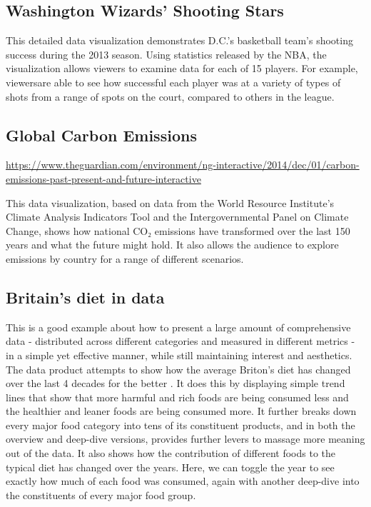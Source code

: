 \documentclass[]{book}
\theoremstyle{definition}
\theoremstyle{definition}
\theoremstyle{definition}
\theoremstyle{remark}
\begin{document}
\subsection{Washington Wizards' Shooting
Stars}\label{washington-wizards-shooting-stars}

\citep{basketball}

This detailed data visualization demonstrates D.C.'s basketball team's
shooting success during the 2013 season. Using statistics released by
the NBA, the visualization allows viewers to examine data for each of 15
players. For example, viewersare able to see how successful each player
was at a variety of types of shots from a range of spots on the court,
compared to others in the league.

\subsection{Global Carbon Emissions}\label{global-carbon-emissions}

\citep{CO2_emission}
\url{https://www.theguardian.com/environment/ng-interactive/2014/dec/01/carbon-emissions-past-present-and-future-interactive}

This data visualization, based on data from the World Resource
Institute's Climate Analysis Indicators Tool and the Intergovernmental
Panel on Climate Change, shows how national CO₂ emissions have
transformed over the last 150 years and what the future might hold. It
also allows the audience to explore emissions by country for a range of
different scenarios.

\subsection{Britain's diet in data}\label{britains-diet-in-data}

This is a good example about how to present a large amount of
comprehensive data - distributed across different categories and
measured in different metrics - in a simple yet effective manner, while
still maintaining interest and aesthetics. The data product attempts to
show how the average Briton's diet has changed over the last 4 decades
for the better \citep{britain_diet_2016}. It does this by displaying
simple trend lines that show that more harmful and rich foods are being
consumed less and the healthier and leaner foods are being consumed
more. It further breaks down every major food category into tens of its
constituent products, and in both the overview and deep-dive versions,
provides further levers to massage more meaning out of the data. It also
shows how the contribution of different foods to the typical diet has
changed over the years. Here, we can toggle the year to see exactly how
much of each food was consumed, again with another deep-dive into the
constituents of every major food group.
\end{document}
